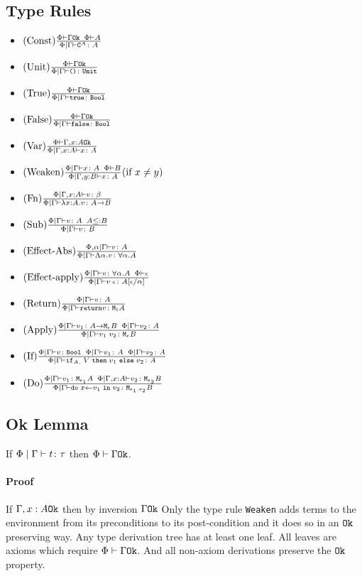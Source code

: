 {\subsection{Type Rules}
\begin{itemize}
    \item $(\text{Const}) \frac{\Phi\vdash \Gamma \texttt{Ok}\;\;\Phi\vdash A}{\Phi\mid\Gamma \vdash \texttt{C}^{A} \colon A}$
    \item $(\text{Unit}) \frac{\Phi\vdash \Gamma \texttt{Ok}}{\Phi\mid\Gamma \vdash \texttt{()} \colon \texttt{Unit}}$
    \item $(\text{True}) \frac{\Phi\vdash \Gamma \texttt{Ok}}{\Phi\mid\Gamma \vdash \texttt{true} \colon \texttt{Bool}}$
    \item $(\text{False}) \frac{\Phi\vdash \Gamma \texttt{Ok}}{\Phi\mid\Gamma \vdash \texttt{false} \colon \texttt{Bool}}$
    \item $(\text{Var}) \frac{\Phi\vdash \Gamma, x: A \texttt{Ok}}{\Phi\mid\Gamma, x: A \vdash x \colon A}$
    \item $(\text{Weaken}) \frac{\Phi\mid\Gamma \vdash x \colon A\;\;\Phi\vdash B}{\Phi\mid\Gamma, y: B \vdash x \colon A}(\text{if } x \neq y)$
    \item $(\text{Fn}) \frac{\Phi\mid\Gamma, x: A \vdash v \colon \beta}{\Phi\mid\Gamma \vdash \lambda x : A. v \colon A\rightarrow B}$
    \item $(\text{Sub}) \frac{\Phi\mid\Gamma \vdash v \colon A\;\; A \leq: B}{\Phi\mid\Gamma \vdash v \colon B}$
    \item $(\text{Effect-Abs}) \frac{\Phi,\alpha\mid\Gamma \vdash v \colon A}{\Phi\mid\Gamma \vdash \Lambda \alpha. v \colon \forall \alpha. A}$
    \item $(\text{Effect-apply}) \frac{\Phi\mid\Gamma \vdash v \colon \forall \alpha. A\;\;\Phi\vdash \epsilon}{\Phi\mid\Gamma \vdash v\;\epsilon \colon A\left[\epsilon / \alpha\right]}$
    \item $(\text{Return}) \frac{\Phi\mid\Gamma \vdash v \colon A}{\Phi\mid\Gamma \vdash \texttt{return} v \colon \texttt{M}_{\texttt{1}}{A}}$
    \item $(\text{Apply}) \frac{\Phi\mid\Gamma \vdash v_1 \colon A \rightarrow \texttt{M}_{\epsilon}{B}\;\;\Phi\mid\Gamma \vdash v_2 \colon A}{\Phi\mid\Gamma \vdash v_1\; v_2 \colon \texttt{M}_{\epsilon}{B}}$
    \item $(\text{If}) \frac{\Phi\mid\Gamma \vdash v \colon \texttt{Bool} \;\; \Phi\mid\Gamma \vdash v_1 \colon A\;\;\Phi\mid\Gamma \vdash v_2 \colon A}{\Phi\mid\Gamma \vdash \texttt{if}_{A, }\; V\; \texttt{then}\; v_1 \;\texttt{else} \; v_2 \colon A}$
    \item $(\text{Do}) \frac{\Phi\mid\Gamma \vdash v_1 \colon \texttt{M}_{\epsilon_1}{A} \;\; \Phi\mid\Gamma, x: A \vdash v_2 \colon \texttt{M}_{\epsilon_2}{B}}{\Phi\mid\Gamma \vdash \texttt{do}\; x \leftarrow v_1 \;\texttt{in}\; v_2 \colon \texttt{M}_{\epsilon_1 \cdot \epsilon_2}{B}}$
\end{itemize}

\subsection{Ok Lemma}
If $\Phi\mid\Gamma \vdash t \colon \tau$ then $\Phi\vdash \Gamma \texttt{Ok}$.
\paragraph{Proof}
If $\Gamma, x: A \texttt{Ok}$ then by inversion $\Gamma \texttt{Ok}$
Only the type rule \texttt{Weaken} adds terms to the environment from its preconditions to its post-condition and it does so in an $\texttt{Ok}$ preserving way. Any type derivation tree has at least one leaf. All leaves are axioms which require $\Phi\vdash \Gamma \texttt{Ok}$. And all non-axiom derivations preserve the $\texttt{Ok}$ property.


}

\ifdefined\NoDocument
\else
\documentclass{report}


    \LanguageDefinition

\fi
